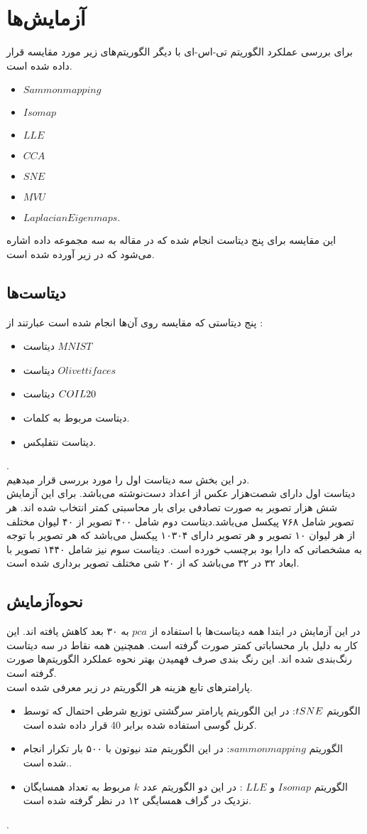 \chapter{آزمایش‌ها}
برای بررسی عملکرد الگوریتم تی-اس-ای   با دیگر الگوریتم‌های زیر مورد مقایسه قرار داده شده است.
\begin{itemize}
	\item $Sammon mapping$
	\item $Isomap$
	\item $LLE$
	\item $CCA$
	\item $SNE$
	\item $MVU$
	\item $ Laplacian Eigenmaps.$
\end{itemize}
این مقایسه برای پنج دیتاست انجام شده که در مقاله به سه مجموعه داده اشاره می‌شود که در زیر آورده شده است.
\section{دیتاست‌ها}
پنج دیتاستی که مقایسه روی آن‌ها انجام شده است عبارتند از :
\begin{itemize}
	\item دیتاست $MNIST$
	\item دیتاست $Olivetti faces$
	\item دیتاست $COIL\-20$
	\item دیتاست مربوط به کلمات.
	\item دیتاست نتفلیکس.
\end{itemize}.
\\
در این بخش سه دیتاست اول را مورد بررسی قرار میدهیم. 
\\
دیتاست اول دارای شصت‌هزار عکس از اعداد دست‌نوشته می‌باشد. برای این‌ آزمایش شش ‌هزار تصویر به صورت تصادفی برای بار محاسبتی کمتر انتخاب شده اند. هر تصویر شامل ۷۶۸ پیکسل می‌باشد.دیتاست دوم شامل ۴۰۰ تصویر از ۴۰ لیوان مختلف از هر لیوان ۱۰ تصویر و هر تصویر دارای ۱۰۳۰۴ پیکسل می‌باشد که هر تصویر با توجه به مشخصاتی که دارا بود برچسب خورده است. دیتاست سوم نیز شامل ۱۴۴۰ تصویر با ابعاد ۳۲ در ۳۲ می‌باشد که از ۲۰ شی مختلف تصویر برداری شده است.

\section{نحوه‌آزمایش}
در این آزمایش در ابتدا همه دیتاست‌ها با استفاده از $pca$ به ۳۰ بعد کاهش یافته اند. این کار به دلیل بار محساباتی کمتر صورت گرفته است. همچنین همه نقاط در سه دیتاست رنگ‌بندی شده اند. این رنگ بندی صرف فهمیدن بهتر نحوه عملکرد الگوریتم‌ها صورت گرفته است.
\\
پارامتر‌های تابع هزینه هر الگوریتم در زیر معرفی شده است.
\begin{itemize}
	\item الگوریتم $t\-SNE$: در این الگوریتم پارامتر سرگشتی توزیع شرطی احتمال که توسط کرنل گوسی استفاده شده برابر 40 قرار داده شده است.
	\item الگوریتم $sammon mapping$: در این الگوریتم متد نیوتون با ۵۰۰ بار تکرار انجام شده است..
	\item الگوریتم $Isomap$ و $LLE$ : در این دو الگوریتم عدد $k$  مربوط به تعداد همسایگان نزدیک در گراف همسایگی ۱۲ در نظر گرفته شده است.
\end{itemize}.
\\
